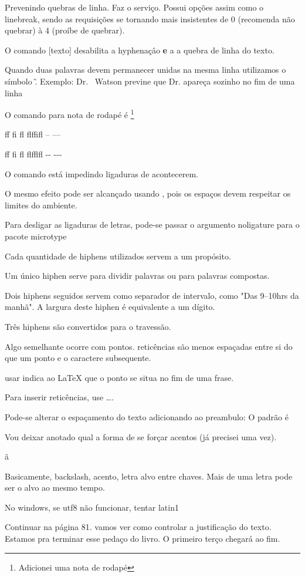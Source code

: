 \documentclass{article}
\begin{document}
Prevenindo quebras de linha.
\nolinebreak Faz o serviço.
Possui opções assim como o linebreak, sendo as requisições 
se tornando mais insistentes de 0 (recomenda não quebrar)
à 4 (proíbe de quebrar).

O comando \mbox[texto] desabilita a hyphenaçâo \textbf{e} a 
a quebra de linha do texto.

Quando duas palavras devem permanecer unidas na mesma linha utilizamos o símbolo \~.
Exemplo:
Dr. ~Watson previne que Dr. apareça sozinho no fim de uma linha

O comando para nota de rodapé é \footnote{Adicionei uma nota de rodapé}


ff fi fl flffifl -- ---

f\/f f\/i f\/l f\/l\/f\/f\/l\/f\/l -\/- -\/-\/-

O comando \/ está impedindo ligaduras de acontecerem.

O mesmo efeito pode ser alcançado usando {},
pois os espaços devem respeitar os limites do ambiente.

Para desligar as ligaduras de letras, pode-se passar o argumento noligature para o pacote microtype

Cada quantidade de hiphens utilizados servem a um propósito.

Um único hiphen serve para dividir palavras ou para palavras compostas.

Dois hiphens seguidos servem como separador de intervalo, como
"Das 9--10hrs da manhã".
A largura deste hiphen é equivalente a um dígito.

Três hiphens são convertidos para o travessão.

Algo semelhante ocorre com pontos.
reticências são menos espaçadas entre si do que um ponto 
e o caractere subsequente.

usar \@ indica ao LaTeX que o ponto se situa no fim de uma frase.

Para inserir reticências, use \ldots.

Pode-se alterar o espaçamento do texto adicionando ao preambulo:
\frenchspacing
O padrão é \nofrenchspacing

Vou deixar anotado qual a forma de se forçar acentos (já precisei uma vez).

\~{a}

Basicamente, backslash, acento, letra alvo entre chaves.
Mais de uma letra pode ser o alvo ao mesmo tempo.

No windows, se utf8 não funcionar, tentar latin1

Continuar na página 81. vamos ver como controlar a justificação do texto.
Estamos pra terminar esse pedaço do livro. O primeiro terço chegará ao fim.
\end{document}
